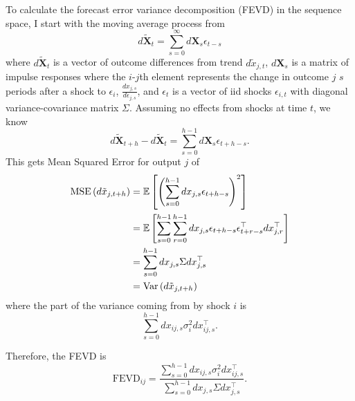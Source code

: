 To calculate the forecast error variance decomposition (FEVD) in the sequence space, I start with the moving average process from \textcite{auclert2021using}
\[
    d \mathbf{\tilde{X}}_t = \sum_{s = 0}^\infty d \mathbf{X}_s \epsilon_{t-s}
\]
where $d \mathbf{\tilde{X}}_t$ is a vector of outcome differences from trend $d \tilde{x}_{j, t}$, $d \mathbf{X}_s$ is a matrix of impulse responses where the $i$-$j$th element represents the change in outcome $j$ $s$ periods after a shock to $\epsilon_i$, $\frac{d x_{j, s}}{d \epsilon_{j, s}}$, and $\epsilon_{t}$ is a vector of iid shocks $\epsilon_{i, t}$ with diagonal variance-covariance matrix $\Sigma$. Assuming no effects from shocks at time $t$, we know
\[
    d \mathbf{\tilde{X}}_{t+h} - d \mathbf{\tilde{X}}_t = \sum_{s = 0}^{h - 1} d \mathbf{X}_s \epsilon_{t+h-s}.
\]
This gets Mean Squared Error for output $j$ of
\begin{align*}
    \text{MSE} \left(d \tilde{x}_{j, t+h}\right) &= \mathbb{E} \left[\left(\sum_{s = 0}^{h - 1} d x_{j, s} \epsilon_{t+h-s}\right)^2 \right] \\
    &= \mathbb{E} \left[\sum_{s = 0}^{h - 1} \sum_{r = 0}^{h - 1} d x_{j, s} \epsilon_{t+h-s} \epsilon_{t+r-s}^\top d x_{j, r}^\top\right] \\
    &= \sum_{s = 0}^{h - 1} d x_{j, s} \Sigma d x_{j, s}^\top \\
    &= \text{Var} \left(d \tilde{x}_{j, t+h}\right)
\end{align*}
where the part of the variance coming from by shock $i$ is
\[
    \sum_{s = 0}^{h - 1} d x_{ij, s} \sigma_i^2 d x_{ij, s}^\top.
\]

Therefore, the FEVD is
\[
    \text{FEVD}_{ij} = \frac{\sum_{s = 0}^{h - 1} d x_{ij, s} \sigma_i^2 d x_{ij, s}^\top}{\sum_{s = 0}^{h - 1} d x_{j, s} \Sigma d x_{j, s}^\top}.
\]
